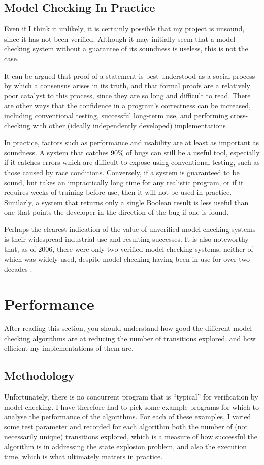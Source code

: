 \documentclass[12pt,a4paper,twoside,openright]{report}
\begin{document}
\subsection{Model Checking In Practice}
Even if I think it unlikely, it is
certainly possible that my project is
unsound, since it has not
been verified.
Although it may initially seem
that a model-checking system without
a guarantee of its
soundness is useless, this
is not the case.

It can be argued \cite{demi79}
that proof of a statement
is best understood as a social process
by which a consensus arises in its
truth, and that formal proofs are a relatively
poor catalyst to this process, since
they are so long and difficult to
read.
There are other
ways that the confidence in a program's
correctness can be increased, including
conventional testing, successful
long-term use, and performing
cross-checking with other (ideally
independently developed) implementations
\cite{beck06, tau02}.

In practice, factors such as
performance and usability are at least
as important as soundness. A system that
catches 90\% of bugs can still be a
useful tool, especially if it catches
errors which are difficult to expose
using conventional testing, such as
those caused by race conditions. 
Conversely, if a system
is guaranteed to be sound, but takes an
impractically long time for any realistic
program, or if it requires
weeks of training before use,
then it will not be used in
practice.
Similarly, a system that
returns only a single Boolean result
is less useful
than one that points the developer
in the direction of the bug if
one is found.

Perhaps the clearest indication of the
value of unverified
model-checking systems is their widespread
industrial use and resulting successes.
\cite{kur08, brat04, low96, kars96, cof10, mill08, new15}
It is also noteworthy that, as of 2006,
there were only
two verified model-checking
systems, neither of which was widely
used, despite model
checking having been in use for
over two decades \cite{beck06}.


\section{Performance}
After reading this section, you should
understand how good the different
model-checking algorithms are at
reducing the number of transitions
explored, and how efficient
my implementations of them are.

\subsection{Methodology}
Unfortunately, there is no concurrent program
that is ``typical'' for verification by model
checking. I have therefore had to pick some
example programs for which to analyse the performance
of the algorithms. For each of these examples, I varied
some test parameter and recorded for each algorithm
both the number of (not necessarily unique) transitions
explored, which is a measure of how successful
the algorithm is in addressing the state
explosion problem, and also
the execution time, which is what ultimately
matters in practice.
\end{document}
